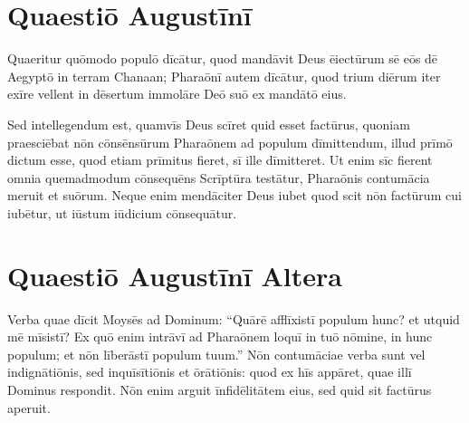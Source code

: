 \section{Quaestiō Augustīnī}

Quaeritur quōmodo populō dīcātur, quod mandāvit Deus ēiectūrum sē eōs dē
Aegyptō in terram Chanaan; Pharaōnī autem dīcātur, quod trium diērum
iter exīre vellent in dēsertum immolāre Deō suō ex mandātō eius.

Sed intellegendum est, quamvīs Deus scīret quid esset factūrus, quoniam
praesciēbat nōn cōnsēnsūrum Pharaōnem ad populum dīmittendum, illud
prīmō dictum esse, quod etiam prīmitus fieret, sī ille dīmitteret. Ut
enim sīc fierent omnia quemadmodum cōnsequēns Scrīptūra testātur,
Pharaōnis contumācia meruit et suōrum. Neque enim mendāciter Deus iubet
quod scit nōn factūrum cui iubētur, ut iūstum iūdicium cōnsequātur. 

\section{Quaestiō Augustīnī Altera}

Verba quae dīcit Moysēs ad Dominum: ``Quārē afflīxistī populum hunc? et
utquid mē mīsistī? Ex quō enim intrāvī ad Pharaōnem loquī in tuō nōmine,
in hunc populum; et nōn līberāstī populum tuum.'' Nōn contumāciae verba
sunt vel indignātiōnis, sed inquīsītiōnis et ōrātiōnis: quod ex hīs
appāret, quae illī Dominus respondit. Nōn enim arguit īnfidēlitātem
eius, sed quid sit factūrus aperuit.
